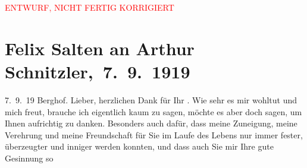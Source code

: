
\begin{center}
            \textcolor{red}{ENTWURF, NICHT FERTIG KORRIGIERT}
                      \end{center}
            
         
         \renewcommand{\erwaehntePersonen}{Personen: Frieda Pollak, Ottilie Salten, Olga Schnitzler}
         \renewcommand{\erwaehnteOrte}{Orte: Berghof, Salzburg, Unterach am Attersee, Wien}
         \renewcommand{\erwaehnteWerke}{Werke: Felix Saltens fünfzigster Geburtstag, Neue Freie Presse}
               \section[ Felix Salten an Arthur Schnitzler, 7. 9. 1919]{ Felix Salten an Arthur Schnitzler, 7. 9. 1919}\nopagebreak{}\rehead{ }\begin{ledgroupsized}[t]{13cm}\normalsize\beginnumbering \toendnotes[C]{\smallbreak\pagebreak[2]} 
\toendnotes[C]{\smallbreak}\pstart
           \raggedleft{}{\pb}7. 9. 19\pend
           \pstart
           \raggedleft{}Berghof.\pend
           \pstart{}Lieber,\pend\pstart
           herzlichen Dank für Ihr \label{K_L03568-1v}\label{K_L03568-1h}. Wie sehr es mir wohltut
               und mich freut, brauche ich eigentlich kaum zu sagen, möchte es aber doch sagen, um
               Ihnen aufrichtig zu danken. Besonders auch dafür, dass meine Zuneigung, meine
               Verehrung und meine Freundschaft für Sie im Laufe des Lebens nur immer fester,
               überzeugter und inniger werden konnten, und dass auch Sie mir Ihre gute Gesinnung so

\end{ledgroupsized}
